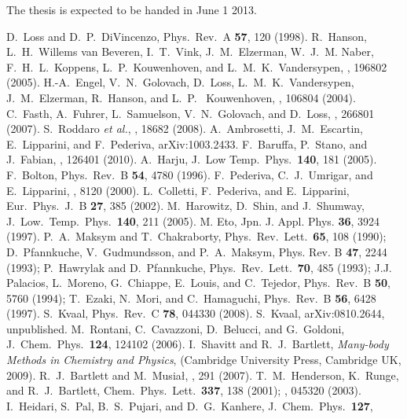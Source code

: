 The thesis is expected to be handed in June 1 2013.


\begin{thebibliography}{200}

 D.~Loss and D.~P.~DiVincenzo, Phys.~Rev.~A {\bf 57}, 120 (1998).
 R.~Hanson, L.~H.~Willems van Beveren, I.~T.~Vink, J.~M.~Elzerman, W.~J.~M. Naber, F.~H.~L.~Koppens, L.~P.~Kouwenhoven, and L.~M.~K.~Vandersypen, , 196802 (2005).
 H.-A.~Engel, V.~N.~Golovach, D.~Loss, L.~M.~K.~Vandersypen, J.~M.~Elzerman, R.~Hanson, and L.~P.~ Kouwenhoven, , 106804 (2004). 
 C.~Fasth, A.~Fuhrer, L.~Samuelson, V.~N.~Golovach, and D.~Loss, , 266801 (2007).
 S.~Roddaro {\em et al.}, , 18682 (2008).
A.~Ambrosetti, J.~M.~Escartin, E.~Lipparini, and F.~Pederiva, arXiv:1003.2433.
 F.~Baruffa, P.~Stano, and J.~Fabian, , 126401 (2010).
 A.~Harju, J.~Low Temp.~Phys.~{\bf 140}, 181 (2005).
 F.~Bolton, Phys.~Rev.~B {\bf 54}, 4780 (1996).
F.~Pederiva, C.~J.~Umrigar, and E.~Lipparini, , 8120 (2000).
L.~Colletti, F.~Pederiva, and  E.~Lipparini,  Eur.~Phys.~J.~B {\bf 27}, 
385 (2002).
 M.~Harowitz, D.~Shin, and J.~Shumway, J.~Low.~Temp.~Phys.~{\bf 140}, 211 (2005).
 M. Eto, Jpn. J. Appl. Phys. {\bf 36}, 3924 (1997).
 P.~A.~Maksym and T.~Chakraborty, Phys.~Rev.~Lett.~{\bf 65}, 108 (1990);
D.~Pfannkuche, V.~Gudmundsson, and P.~A.~Maksym, Phys. Rev. B {\bf 47}, 2244 (1993);
P.~Hawrylak and D.~Pfannkuche, Phys.~Rev.~Lett.~{\bf 70}, 485 (1993); J.J. Palacios,
L.~Moreno, G.~Chiappe, E.~Louis, and C.~Tejedor, Phys.~Rev.~B {\bf 50}, 5760 (1994);
T.~Ezaki, N.~Mori, and C.~Hamaguchi, Phys.~Rev.~B {\bf 56}, 6428 (1997).
 S.~Kvaal, Phys.~Rev.~C {\bf 78}, 044330 (2008).
 S.~Kvaal, arXiv:0810.2644, unpublished.
 M.~Rontani, C.~Cavazzoni, 
D.~Belucci, and G.~Goldoni, J.~Chem.~Phys.~{\bf 124}, 124102 (2006).
 I.~Shavitt and R.\ J.\ Bartlett, {\em Many-body Methods in Chemistry and Physics},  
(Cambridge University Press, Cambridge UK, 2009). 
 R.\ J.\ Bartlett and M.\ Musia{\l}, , 291 (2007).
 T.~M.~Henderson, K.~Runge, and R.~J.~Bartlett, Chem.~Phys.~Lett.~{\bf 337}, 138 (2001); , 045320 (2003).
 I.~Heidari, S.~Pal, B.~S.~Pujari, and D.~G.~Kanhere, J.~Chem.~Phys.~{\bf 127}, 

\end{thebibliography}
